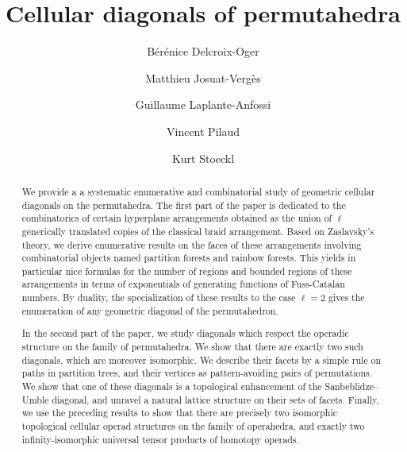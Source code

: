 \documentclass{amsart}
\title{Cellular diagonals of permutahedra}
\author[B. Delcroix-Oger]{B\'er\'enice Delcroix-Oger}
\author[M. Josuat-Verg\`es]{Matthieu Josuat-Verg\`es}
\author[G. Laplante-Anfossi]{Guillaume Laplante-Anfossi}
\author[V. Pilaud]{Vincent Pilaud}
\author[K. Stoeckl]{Kurt Stoeckl}
\theoremstyle{definition}
\begin{document}
\begin{abstract}
We provide a a systematic enumerative and combinatorial study of geometric cellular diagonals on the permutahedra. 
The first part of the paper is dedicated to the combinatorics of certain hyperplane arrangements obtained as the union of $\ell$ generically translated copies of the classical braid arrangement.
Based on Zaslavsky's theory, we derive enumerative results on the faces of these arrangements involving combinatorial objects named partition forests and rainbow forests.
This yields in particular nice formulas for the number of regions and bounded regions of these arrangements in terms of exponentials of generating functions of Fuss-Catalan numbers.
By duality, the specialization of these results to the case $\ell = 2$ gives the enumeration of any geometric diagonal of the permutahedron.

In the second part of the paper, we study diagonals which respect the operadic structure on the family of permutahedra.
We show that there are exactly two such diagonals, which are moreover isomorphic.
We describe their facets by a simple rule on paths in partition trees, and their vertices as pattern-avoiding pairs of permutations.
We show that one of these diagonals is a topological enhancement of the Sanbeblidze--Umble diagonal, and unravel a natural lattice structure on their sets of facets.
Finally, we use the preceding results to show that there are precisely two isomorphic topological cellular operad structures on the family of operahedra, and exactly two infinity-isomorphic universal tensor products of homotopy operads.
\end{abstract}

\vspace*{-.5cm}
\maketitle
\end{document}
